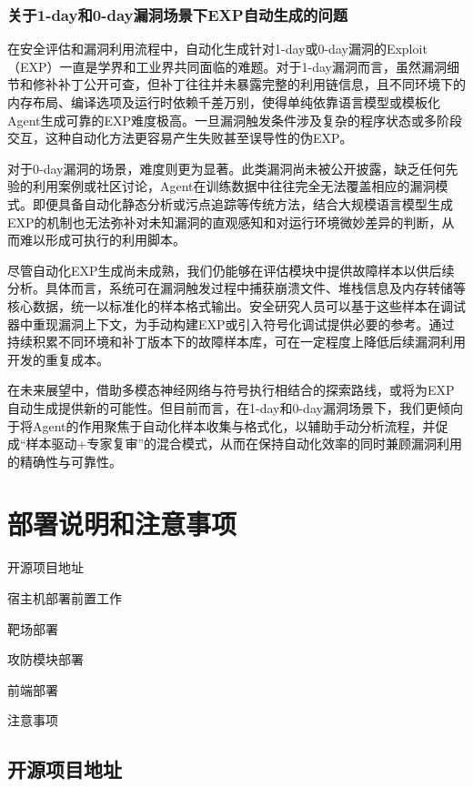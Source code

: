 \documentclass[lang=cn,10pt]{elegantbook}
\begin{document}
\subsection{关于1-day和0-day漏洞场景下EXP自动生成的问题}
在安全评估和漏洞利用流程中，自动化生成针对1-day或0-day漏洞的Exploit（EXP）一直是学界和工业界共同面临的难题。对于1-day漏洞而言，虽然漏洞细节和修补补丁公开可查，但补丁往往并未暴露完整的利用链信息，且不同环境下的内存布局、编译选项及运行时依赖千差万别，使得单纯依靠语言模型或模板化Agent生成可靠的EXP难度极高。一旦漏洞触发条件涉及复杂的程序状态或多阶段交互，这种自动化方法更容易产生失败甚至误导性的伪EXP。

对于0-day漏洞的场景，难度则更为显著。此类漏洞尚未被公开披露，缺乏任何先验的利用案例或社区讨论，Agent在训练数据中往往完全无法覆盖相应的漏洞模式。即便具备自动化静态分析或污点追踪等传统方法，结合大规模语言模型生成EXP的机制也无法弥补对未知漏洞的直观感知和对运行环境微妙差异的判断，从而难以形成可执行的利用脚本。

尽管自动化EXP生成尚未成熟，我们仍能够在评估模块中提供故障样本以供后续分析。具体而言，系统可在漏洞触发过程中捕获崩溃文件、堆栈信息及内存转储等核心数据，统一以标准化的样本格式输出。安全研究人员可以基于这些样本在调试器中重现漏洞上下文，为手动构建EXP或引入符号化调试提供必要的参考。通过持续积累不同环境和补丁版本下的故障样本库，可在一定程度上降低后续漏洞利用开发的重复成本。

在未来展望中，借助多模态神经网络与符号执行相结合的探索路线，或将为EXP自动生成提供新的可能性。但目前而言，在1-day和0-day漏洞场景下，我们更倾向于将Agent的作用聚焦于自动化样本收集与格式化，以辅助手动分析流程，并促成“样本驱动+专家复审”的混合模式，从而在保持自动化效率的同时兼顾漏洞利用的精确性与可靠性。



\chapter{部署说明和注意事项}
\hypertarget{chap:deploy}{}

\begin{introduction}
    \item 开源项目地址
    \item 宿主机部署前置工作
    \item 靶场部署
    \item 攻防模块部署
    \item 前端部署
    \item 注意事项
\end{introduction}

\section{开源项目地址} 
\end{document}
